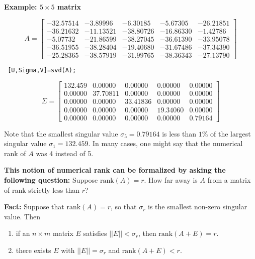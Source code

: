\documentclass[letterpaper]{article}
\begin{document}
\newpage


\textbf{Example: $5 \times 5$ matrix}

$$A=\left[ \begin{array}{rrrrr}-32.57514& -3.89996& -6.30185& -5.67305& -26.21851\\-36.21632& -11.13521& -38.80726& -16.86330& -1.42786\\-5.07732& -21.86599& -38.27045& -36.61390& -33.95078\\-36.51955& -38.28404& -19.40680& -31.67486& -37.34390\\-25.28365& -38.57919& -31.99765& -38.36343& -27.13790\end{array}
 \right] $$

 \begin{verbatim}
 [U,Sigma,V]=svd(A);
 \end{verbatim}

 $$ \Sigma=\left[\begin{array}{rrrrr}132.459& 0.00000&0.00000&0.00000&0.00000\\0.00000&37.70811& 0.00000&0.00000&0.00000\\0.00000&0.00000&33.41836& 0.00000&0.00000\\0.00000&0.00000&0.00000&19.34060& 0.00000\\0.00000& 0.00000& 0.00000& 0.00000& 0.79164\end{array}\right] $$


Note that the smallest singular value $\sigma_5 = 0.79164$  is less than $1\%$ of the largest singular value $\sigma_1=132.459$. In many cases, one might say that the numerical rank of $A$ was 4 instead of 5.

\textbf{This notion of numerical rank can be formalized by asking the following question:} Suppose $\text{rank}(A) = r$. How far away is $A$ from a matrix of rank strictly less than $r$?

\newpage

\textbf{Fact:} Suppose that $\text{rank}(A) = r$, so that $\sigma_r$ is the smallest non-zero singular value. Then

\begin{enumerate}
\setlength{\itemsep}{.1in}
\renewcommand{\labelenumi}{(\roman{enumi})}
\item if an $n \times m$ matrix $E$ satisfies $||E|| < \sigma_r$, then $\text{rank} (A+E) = r.$

\item there exists $E$ with $||E|| = \sigma_r$ and $\text{rank}(A+E) < r$.
\end{enumerate}
\end{document}
